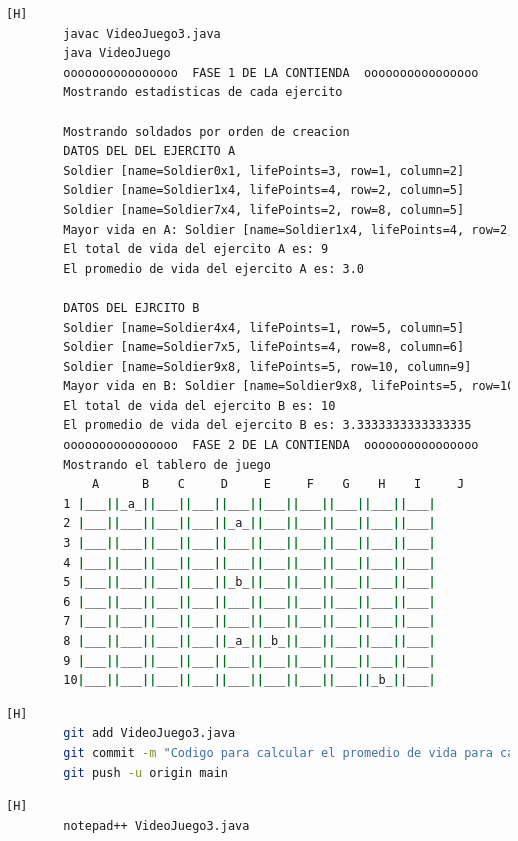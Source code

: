 \documentclass{article}
\begin{document}
	
	\begin{lstlisting}[language=bash,caption={Compilando y probando }][H]
		javac VideoJuego3.java
		java VideoJuego
		oooooooooooooooo  FASE 1 DE LA CONTIENDA  oooooooooooooooo
		Mostrando estadisticas de cada ejercito
		
		Mostrando soldados por orden de creacion
		DATOS DEL DEL EJERCITO A
		Soldier [name=Soldier0x1, lifePoints=3, row=1, column=2]
		Soldier [name=Soldier1x4, lifePoints=4, row=2, column=5]
		Soldier [name=Soldier7x4, lifePoints=2, row=8, column=5]
		Mayor vida en A: Soldier [name=Soldier1x4, lifePoints=4, row=2, column=5]
		El total de vida del ejercito A es: 9
		El promedio de vida del ejercito A es: 3.0
		
		DATOS DEL EJRCITO B
		Soldier [name=Soldier4x4, lifePoints=1, row=5, column=5]
		Soldier [name=Soldier7x5, lifePoints=4, row=8, column=6]
		Soldier [name=Soldier9x8, lifePoints=5, row=10, column=9]
		Mayor vida en B: Soldier [name=Soldier9x8, lifePoints=5, row=10, column=9]
		El total de vida del ejercito B es: 10
		El promedio de vida del ejercito B es: 3.3333333333333335
		oooooooooooooooo  FASE 2 DE LA CONTIENDA  oooooooooooooooo
		Mostrando el tablero de juego
		    A      B    C     D     E     F    G    H    I     J
		1 |___||_a_||___||___||___||___||___||___||___||___|
		2 |___||___||___||___||_a_||___||___||___||___||___|
		3 |___||___||___||___||___||___||___||___||___||___|
		4 |___||___||___||___||___||___||___||___||___||___|
		5 |___||___||___||___||_b_||___||___||___||___||___|
		6 |___||___||___||___||___||___||___||___||___||___|
		7 |___||___||___||___||___||___||___||___||___||___|
		8 |___||___||___||___||_a_||_b_||___||___||___||___|
		9 |___||___||___||___||___||___||___||___||___||___|
		10|___||___||___||___||___||___||___||___||_b_||___|
	\end{lstlisting}
	
	
	\begin{lstlisting}[language=bash,caption={Commit:Codigo para calcular el promedio de vida para cada ejercito}][H]
		git add VideoJuego3.java
		git commit -m "Codigo para calcular el promedio de vida para cada ejercito"			
		git push -u origin main
	\end{lstlisting}	
	
	
	
	
	\begin{lstlisting}[language=bash,caption={Se implementa el método que ordena el ArrayList mostrando un ranking}][H]
		notepad++ VideoJuego3.java
	\end{lstlisting}
	
\end{document}
